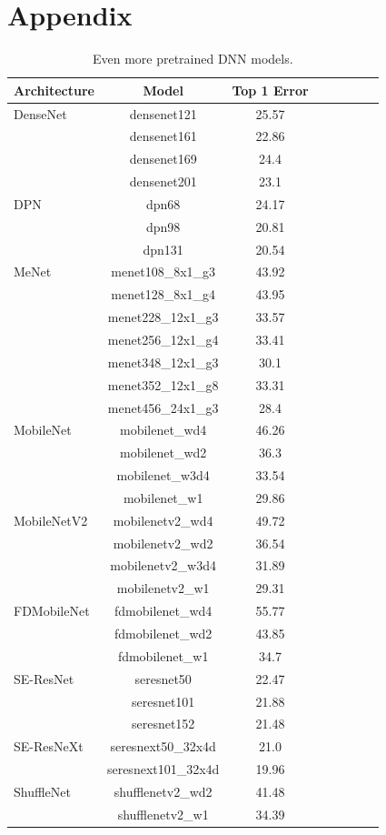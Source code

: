 \newpage
\section{Appendix}
\label{sxn:appendix}



\begin{table}[t]
\small
\begin{center}
\begin{tabular}{|p{1in}|c|c|c|c|c|c|c|}
\hline
Architecture 
 & Model
 & Top 1 Error \\
 \hline
 DenseNet & densenet121 & 25.57 & \\
& densenet161 & 22.86 & \\
& densenet169 & 24.4 & \\
& densenet201 & 23.1 & \\\hline
DPN & dpn68 & 24.17 & \\
& dpn98 & 20.81 & \\
& dpn131 & 20.54 & \\
\hline
MeNet & menet108\_8x1\_g3 & 43.92 & \\
& menet128\_8x1\_g4 & 43.95 & \\
& menet228\_12x1\_g3 & 33.57 & \\
& menet256\_12x1\_g4 & 33.41 & \\
& menet348\_12x1\_g3 & 30.1 & \\
& menet352\_12x1\_g8 & 33.31 & \\
& menet456\_24x1\_g3 & 28.4 & \\
\hline
MobileNet & mobilenet\_wd4 & 46.26 & \\
& mobilenet\_wd2 & 36.3 & \\
& mobilenet\_w3d4 & 33.54 & \\
& mobilenet\_w1 & 29.86 & \\
\hline
MobileNetV2 & mobilenetv2\_wd4 & 49.72 & \\
& mobilenetv2\_wd2 & 36.54 & \\
& mobilenetv2\_w3d4 & 31.89 & \\
& mobilenetv2\_w1 & 29.31 & \\
\hline
FDMobileNet & fdmobilenet\_wd4 & 55.77 & \\
& fdmobilenet\_wd2 & 43.85 & \\
& fdmobilenet\_w1 & 34.7 & \\
\hline
SE-ResNet & seresnet50 & 22.47 & \\
& seresnet101 & 21.88 & \\
& seresnet152 & 21.48 & \\
\hline
SE-ResNeXt & seresnext50\_32x4d & 21.0 & \\
& seresnext101\_32x4d & 19.96 & \\
\hline
ShuffleNet & shufflenetv2\_wd2 & 41.48 & \\
& shufflenetv2\_w1 & 34.39 & \\
\hline
\end{tabular}
\end{center}
\caption{Even more pretrained DNN models.  }
\label{table:models}
\end{table}



